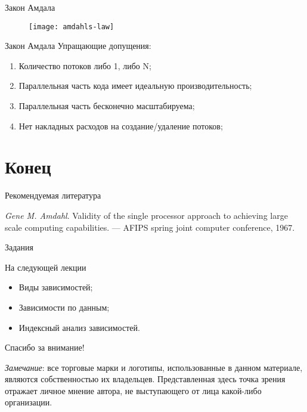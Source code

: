 \begin{frame}{Закон Амдала}
\begin{figure}
    \centering
    \texttt{[image: amdahls-law]}
\end{figure}
\end{frame}

\begin{frame}{Закон Амдала}
Упращающие допущения:
\begin{enumerate}
    \item Количество потоков либо 1, либо N;
    \item Параллельная часть кода имеет идеальную производительность;
    \item Параллельная часть бесконечно масштабируема;
    \item Нет накладных расходов на создание/удаление потоков;
\end{enumerate}
\end{frame}

\section*{Конец}

\begin{frame}[allowframebreaks]{Рекомендуемая литература}
\begin{thebibliography}{99}
    \bibitem{} \textit{Gene M. Amdahl}. Validity of the single processor
    approach to achieving large scale computing capabilities. --- AFIPS spring
    joint computer conference, 1967.
\end{thebibliography}
\end{frame}

\begin{frame}{Задания}
\end{frame}

\begin{frame}{На следующей лекции}
\begin{itemize}
\ifsbertech
    \item Виды зависимостей;
    \item Зависимости по данным;
    \item Индексный анализ зависимостей.
\fi
\end{itemize}
\end{frame}

\begin{frame}

{\huge{Спасибо за внимание!}\par}

\vfill

\tiny{\textit{Замечание}: все торговые марки и логотипы, использованные в данном материале, являются собственностью их владельцев. Представленная здесь точка зрения отражает личное мнение автора, не выступающего от лица какой-либо организации.}

\end{frame}


